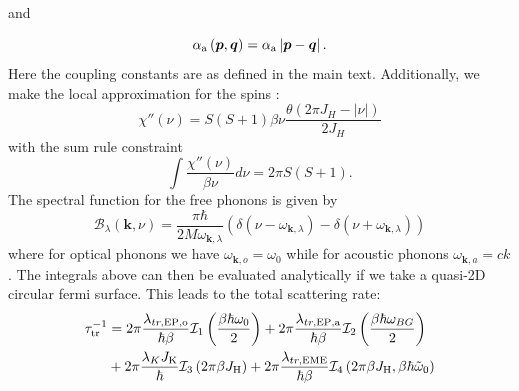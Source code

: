 \documentclass[aps,prl,twocolumn,superscriptaddress,amsmath,nofootinbib,10pt,floatfix]{revtex4-2}
\begin{document}
\begin{widetext}
and 

\begin{equation}
\alpha_{\rm{a}}\left(\boldsymbol{p},\boldsymbol{q}\right)=\alpha_{\rm{a}}\left|\boldsymbol{p}-\boldsymbol{q}\right|.
\end{equation}
Here the coupling constants are as defined in the main text. Additionally,
we make the local approximation for the spins \cite{mcroberts2022intermediatescale}:
\begin{equation}
\chi''\left(\nu\right)=S\left(S+1\right)\beta\nu\frac{\theta\left(2\pi J_{H}-\left|\nu\right|\right)}{2J_{H}}
\end{equation}
with the sum rule constraint 
\begin{equation}
\int\frac{\chi''\left(\nu\right)}{\beta\nu}d\nu=2\pi S\left(S+1\right).
\end{equation}
The spectral function for the free phonons is given by 
\begin{equation}
\mathcal{B}_{\lambda}\left(\boldsymbol{k},\nu\right)=\frac{\pi\hbar}{2M\omega_{\boldsymbol{k},\lambda}}\left(\delta\left(\nu-\omega_{\boldsymbol{k},\lambda}\right)-\delta\left(\nu+\omega_{\boldsymbol{k},\lambda}\right)\right)
\end{equation}
where for optical phonons we have $\omega_{\boldsymbol{k},o}=\omega_{0}$
while for acoustic phonons $\omega_{\boldsymbol{k},a}=ck$. The integrals
above can then be evaluated analytically if we take a quasi-2D circular
fermi surface. This leads to the total scattering rate: 
\begin{align}
\tau_{\rm{tr}}^{-1} & =2\pi\frac{\lambda_{tr,\rm{EP},o}}{\hbar\beta}\mathcal{I}_{1}\left(\frac{\beta\hbar\omega_{0}}{2}\right)+2\pi\frac{\lambda_{tr,\rm{EP},a}}{\hbar\beta}\mathcal{I}_{2}\left(\frac{\beta\hbar\omega_{BG}}{2}\right) \nonumber\\
 & +2\pi\frac{\lambda_{K}J_{\rm{K}}}{\hbar}\mathcal{I}_{3}\left(2\pi\beta J_{\rm{H}}\right)+2\pi\frac{\lambda_{tr,\rm{EME}}}{\hbar\beta}\mathcal{I}_{4}\left(2\pi\beta J_{\rm{H}},\beta\hbar\tilde{\omega}_{0}\right)
 \label{eqn:transport_rate}
\end{align}


\end{widetext}
\end{document}
